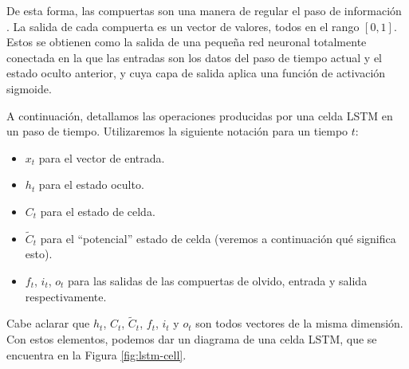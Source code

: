 \documentclass[../../main.tex]{subfiles}
\begin{document}
De esta forma, las compuertas son una manera de regular el paso de información
\cite{colahs-blog-lstm-2015}. La salida de cada compuerta es un vector de valores, todos en
el rango \([0,1]\). Estos se obtienen como la salida de una pequeña red neuronal
totalmente conectada en la que las entradas son los datos del paso de tiempo actual y el
estado oculto anterior, y cuya capa de salida aplica una función de activación sigmoide.

A continuación, detallamos las operaciones producidas por una celda LSTM en un paso de
tiempo. Utilizaremos la siguiente notación para un tiempo \(t\):
\begin{itemize}[itemsep=0.1cm]
    \item \(x_t\) para el vector de entrada.
    \item \(h_t\) para el estado oculto.
    \item \(C_t\) para el estado de celda.
    \item \(\tilde{C}_t\) para el ``potencial'' estado de celda (veremos a continuación
    qué significa esto).
    \item \(f_t\), \(i_t\), \(o_t\) para las salidas de las compuertas de olvido,
    entrada y salida respectivamente.
\end{itemize}
Cabe aclarar que \(h_t\), \(C_t\), \(\tilde{C}_t\), \(f_t\), \(i_t\) y \(o_t\) son todos
vectores de la misma dimensión. Con estos elementos, podemos dar un diagrama de una celda
LSTM, que se encuentra en la Figura \ref{fig:lstm-cell}.
\end{document}
